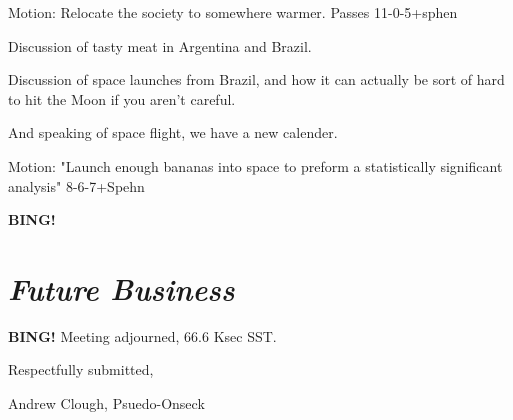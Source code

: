 \documentclass[10pt]{article}
\newcommand{\bing}{{\bf BING!} }
\newcommand{\goto}[1]{\bing \vskip 12pt \section*{{\em{#1}}}}
\begin{document}
Motion:  Relocate the society to somewhere warmer.  Passes 11-0-5+sphen

Discussion of tasty meat in Argentina and Brazil.

Discussion of space launches from Brazil, and how it can actually be
sort of hard to hit the Moon if you aren't careful.

And speaking of space flight, we have a new calender.

Motion: "Launch enough bananas into space to preform a statistically
significant analysis" 8-6-7+Spehn

\goto{Future Business}

\bing
\noindent
Meeting adjourned, 66.6 Ksec SST.

\vspace{18pt}

\centerline{Respectfully submitted,}
\centerline{Andrew Clough, Psuedo-Onseck}
\end{document}
